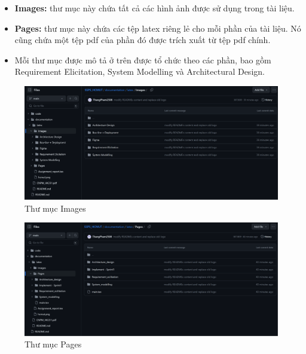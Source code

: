 \begin{itemize}
\begin{itemize}
\begin{figure}[H]
    \end{figure}
    \begin{itemize}
        \item \textbf{Images:} thư mục này chứa tất cả các hình ảnh được sử dụng trong tài liệu.
        \item \textbf{Pages:} thư mục này chứa các tệp latex riêng lẻ cho mỗi phần của tài liệu. Nó cũng chứa một tệp pdf của phần đó được trích xuất từ tệp pdf chính.
        \item Mỗi thư mục được mô tả ở trên được tổ chức theo các phần, bao gồm Requirement Elicitation, System Modelling và Architectural Design.
    \end{itemize}
    \begin{figure}[H]
        \begin{center}
            \includegraphics[width=1\textwidth]{Images/Github/github-images.png}
            \caption{Thư mục Images}
        \end{center}
    \end{figure}
    \begin{figure}[H]
        \begin{center}
            \includegraphics[width=1\textwidth]{Images/Github/github-pages.png}
            \caption{Thư mục Pages}
        \end{center}
    \end{figure}

\end{itemize}
\end{itemize}
